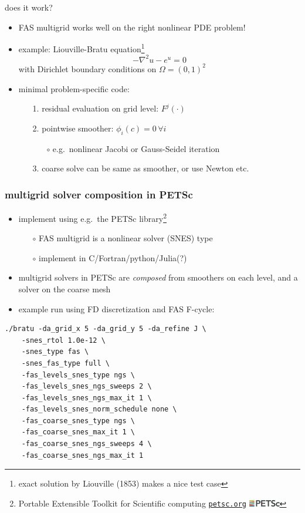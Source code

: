 \documentclass[svgnames,
               hyperref={colorlinks,citecolor=DeepPink4,linkcolor=FireBrick,urlcolor=Maroon},
               usepdftitle=false]  %
               {beamer}
\begin{document}
\begin{frame}{does it work?}

\begin{itemize}
\item FAS multigrid works well on the right nonlinear PDE problem!
\item example: Liouville-Bratu equation\footnote{exact solution by Liouville (1853) makes a nice test case}
    $$-\nabla^2 u - e^u = 0$$
with Dirichlet boundary conditions on $\Omega=(0,1)^2$
\item minimal problem-specific code:
    \begin{enumerate}
    \item[1.] residual evaluation on grid level: $F^j(\cdot)$
    \item[2.] pointwise smoother: $\phi_i(c) = 0 \,\forall i$
        \begin{itemize}
        \item[$\circ$] e.g.~nonlinear Jacobi or Gauss-Seidel iteration
        \end{itemize}
    \item[3.] coarse solve can be same as smoother, or use Newton etc.
    \end{enumerate}
\end{itemize}
\end{frame}


\begin{frame}[fragile]
\frametitle{multigrid solver composition in PETSc}

\begin{itemize}
\item implement using e.g.~the PETSc library\footnote{Portable Extensible Toolkit for Scientific computing \quad \href{https://petsc.org/release/}{\texttt{petsc.org}} \quad \includegraphics[height=3mm]{images/petsc.png}}
    \begin{itemize}
    \item[$\circ$] FAS multigrid is a nonlinear solver (SNES) type
    \item[$\circ$] implement in C/Fortran/python/Julia(?)
    \end{itemize}
\item multigrid solvers in PETSc are \emph{composed} from smoothers on each level, and a solver on the coarse mesh
\item example run using FD discretization and FAS F-cycle:
\end{itemize}
\begin{Verbatim}[xleftmargin=15mm,fontsize=\scriptsize]
./bratu -da_grid_x 5 -da_grid_y 5 -da_refine J \
    -snes_rtol 1.0e-12 \
    -snes_type fas \
    -snes_fas_type full \
    -fas_levels_snes_type ngs \
    -fas_levels_snes_ngs_sweeps 2 \
    -fas_levels_snes_ngs_max_it 1 \
    -fas_levels_snes_norm_schedule none \
    -fas_coarse_snes_type ngs \
    -fas_coarse_snes_max_it 1 \
    -fas_coarse_snes_ngs_sweeps 4 \
    -fas_coarse_snes_ngs_max_it 1 
\end{Verbatim}

\end{frame}
\end{document}
